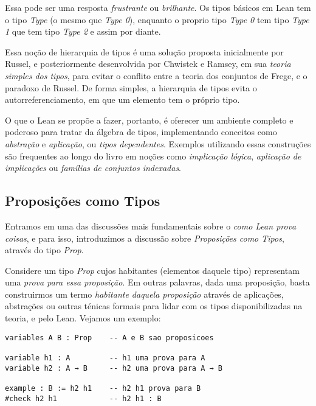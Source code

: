 \noindent Essa pode ser uma resposta \textit{frustrante} ou \textit{brilhante}.
Os tipos básicos em Lean tem o tipo \textit{Type} (o mesmo que \textit{Type 0}), enquanto o proprio tipo \textit{Type 0} tem tipo \textit{Type 1} que tem tipo \textit{Type 2} e assim por diante.

Essa noção de hierarquia de tipos é uma solução proposta inicialmente por Russel, e posteriormente desenvolvida por Chwistek e Ramsey, em sua \textit{teoria simples dos tipos}, para evitar o conflito entre a teoria dos conjuntos de Frege, e o paradoxo de Russel.
De forma simples, a hierarquia de tipos evita o autorreferenciamento, em que um elemento tem o próprio tipo.

O que o Lean se propõe a fazer, portanto, é oferecer um ambiente completo e poderoso para tratar da álgebra de tipos, implementando conceitos como \textit{abstração} e \textit{aplicação}, ou \textit{tipos dependentes}.
Exemplos utilizando essas construções são frequentes ao longo do livro em noções como \textit{implicação lógica}, \textit{aplicação de implicações} ou \textit{famílias de conjuntos indexadas}.

\subsection{Proposições como Tipos}
Entramos em uma das discussões mais fundamentais sobre o \textit{como Lean prova coisas}, e para isso, introduzimos a discussão sobre \textit{Proposições como Tipos}, através do tipo \textit{Prop}.

Considere um tipo \textit{Prop} cujos habitantes (elementos daquele tipo) representam uma \textit{prova para essa proposição}.
Em outras palavras, dada uma proposição, basta construirmos um termo \textit{habitante daquela proposição} através de aplicações, abstrações ou outras ténicas formais para lidar com os tipos disponibilizadas na teoria, e pelo Lean.
Vejamos um exemplo:

\vspace{5mm}
\begin{lstlisting}
variables A B : Prop    -- A e B sao proposicoes

variable h1 : A         -- h1 uma prova para A
variable h2 : A → B     -- h2 uma prova para A → B

example : B := h2 h1    -- h2 h1 prova para B
#check h2 h1            -- h2 h1 : B
\end{lstlisting}
\vspace{5mm}

